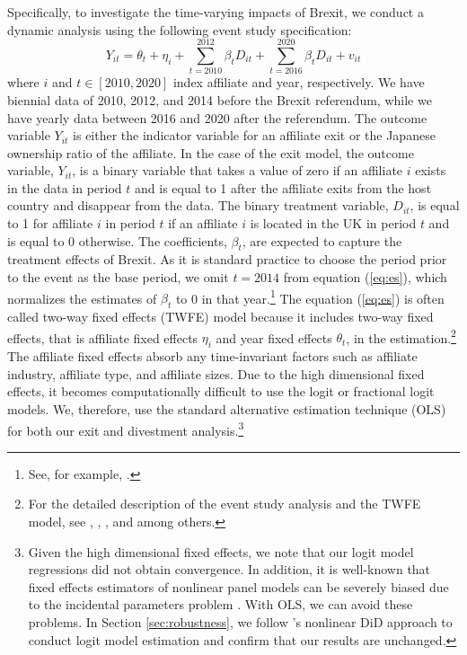 \documentclass[preprint,11pt,authoryear]{elsarticle}
\begin{document}
Specifically, to investigate the time-varying impacts of Brexit, we conduct a dynamic analysis using the following event study specification:
\begin{equation}\label{eq:es} 
Y_{i t}=\theta_{t}
+ \eta_{i}
+ \sum_{t =2010}^{2012} \beta_{t} D_{i t}
+ \sum_{t = 2016}^{2020} \beta_{t} D_{i t}
+v_{i t}
\end{equation}
where $i$ and $t \in [2010, 2020]$ index affiliate and year, respectively.
We have biennial data of 2010, 2012, and 2014 before the Brexit referendum, while we have yearly data between 2016 and 2020 after the referendum.
The outcome variable $Y_{it}$ is either the indicator variable for an affiliate exit or the Japanese ownership ratio of the affiliate.
In the case of the exit model, the outcome variable, $Y_{it}$, is a binary variable that takes a value of zero if an affiliate $i$ exists in the data in period $t$ and is equal to 1 after the affiliate exits from the host country and disappear from the data.
The binary treatment variable, $D_{i t}$, is equal to 1 for affiliate $i$ in period $t$ if an affiliate $i$ is located in the UK in period $t$ and is equal to 0 otherwise. 
The coefficients, $\beta_{t}$, are expected to capture the treatment effects of Brexit.
As it is standard practice to choose the period prior to the event as the base period, we omit $t = 2014$ from equation (\ref{eq:es}), which normalizes the estimates of $\beta_{t}$ to 0 in that year.\footnote{See, for example, \cite{frey2021}.} 
The equation (\ref{eq:es}) is often called two-way fixed effects (TWFE) model because it includes two-way fixed effects, that is affiliate fixed effects $\eta_{i}$ and year fixed effects $\theta_{t}$, in the estimation.\footnote{For the detailed description of the event study analysis and the TWFE model, see \cite{de2020two}, \cite{sun2021estimating}, \cite{callaway2023difference}, and \cite{roth2023survey} among others.}
The affiliate fixed effects absorb any time-invariant factors such as affiliate industry, affiliate type, and affiliate sizes.
Due to the high dimensional fixed effects, it becomes computationally difficult to use the logit or fractional logit models. We, therefore, use the standard alternative estimation technique (OLS) for both our exit and divestment analysis.\footnote{Given the high dimensional fixed effects, we note that our logit model regressions did not obtain convergence. In addition, it is well-known that fixed effects estimators of nonlinear panel models can be severely biased due to the incidental parameters problem \citep{fernandez2009fixed, fernandez2018fixed}.
With OLS, we can avoid these problems. In Section \ref{sec:robustness}, we follow \cite{wooldridge2021two, wooldridge2023simple}'s nonlinear DiD approach to conduct logit model estimation and confirm that our results are unchanged.
} 
\end{document}
